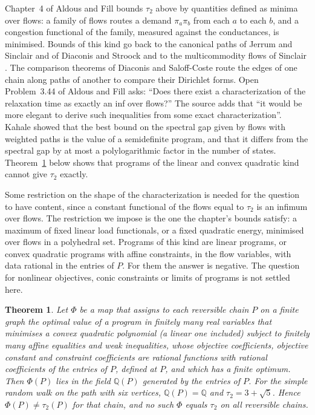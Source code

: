 \documentclass[11pt]{amsart}
\newtheorem{theorem}{Theorem}[section]
\theoremstyle{remark}
\numberwithin{equation}{section}
\newcommand{\Q}{\mathbb Q}
\begin{document}
Chapter~4 of Aldous and Fill \cite{AF} bounds $\tau_2$ above by quantities defined as minima over flows: a family of flows routes a demand $\pi_a\pi_b$ from each $a$ to each $b$, and a congestion functional of the family, measured against the conductances, is minimised. Bounds of this kind go back to the canonical paths of Jerrum and Sinclair \cite{JS} and of Diaconis and Stroock \cite{DS} and to the multicommodity flows of Sinclair \cite{S}. The comparison theorems of Diaconis and Saloff-Coste \cite{DSC} route the edges of one chain along paths of another to compare their Dirichlet forms. Open Problem~3.44 of Aldous and Fill asks: ``Does there exist a characterization of the relaxation time as exactly an inf over flows?'' The source adds that ``it would be more elegant to derive such inequalities from some exact characterization''. Kahale \cite{K} showed that the best bound on the spectral gap given by flows with weighted paths is the value of a semidefinite program, and that it differs from the spectral gap by at most a polylogarithmic factor in the number of states. Theorem~\ref{thm:main} below shows that programs of the linear and convex quadratic kind cannot give $\tau_2$ exactly.

Some restriction on the shape of the characterization is needed for the question to have content, since a constant functional of the flows equal to $\tau_2$ is an infimum over flows. The restriction we impose is the one the chapter's bounds satisfy: a maximum of fixed linear load functionals, or a fixed quadratic energy, minimised over flows in a polyhedral set. Programs of this kind are linear programs, or convex quadratic programs with affine constraints, in the flow variables, with data rational in the entries of $P$. For them the answer is negative. The question for nonlinear objectives, conic constraints or limits of programs is not settled here.

\begin{theorem}\label{thm:main}
Let $\Phi$ be a map that assigns to each reversible chain $P$ on a finite graph the optimal value of a program in finitely many real variables that minimises a convex quadratic polynomial (a linear one included) subject to finitely many affine equalities and weak inequalities, whose objective coefficients, objective constant and constraint coefficients are rational functions with rational coefficients of the entries of $P$, defined at $P$, and which has a finite optimum. Then $\Phi(P)$ lies in the field $\Q(P)$ generated by the entries of $P$. For the simple random walk on the path with six vertices, $\Q(P)=\Q$ and $\tau_2=3+\sqrt5$. Hence $\Phi(P)\ne\tau_2(P)$ for that chain, and no such $\Phi$ equals $\tau_2$ on all reversible chains.
\end{theorem}
\end{document}
